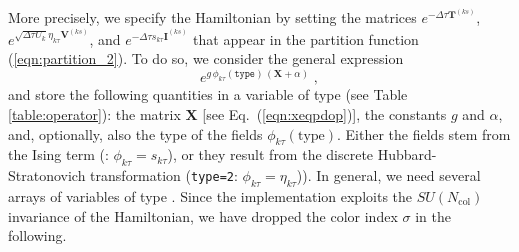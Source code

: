 More precisely, we specify the Hamiltonian by setting  the matrices 
$ e^{-\Delta \tau {\bm T}^{(ks)}}$, $e^{  \sqrt{ \Delta \tau  U_k} \eta_{k\tau} {\bm V}^{(ks)} }$, and $e^{  -\Delta \tau s_{k\tau}  {\bm I}^{(ks)}}$ that appear in the 
partition function (\ref{eqn:partition_2}). 
To do so, we consider the general expression
\begin{equation}\label{eqn:exponent_mat}
e^{g \,\phi_{k\tau}(\texttt{type})\,\left(\mathbf{X} + \alpha\right)}\;,
\end{equation}
and store the following quantities in a variable of type  (see Table \ref{table:operator}):
the matrix $\mathbf{X}$ [see Eq.~(\ref{eqn:xeqpdop})], the constants $g$ and $\alpha$, and, optionally, also 
the type of the fields $\phi_{k\tau}(\text{type})$.  Either the fields
stem from the Ising term (: $\phi_{k\tau}=s_{k\tau}$), or they result from the discrete Hubbard-Stratonovich transformation (\texttt{type=2}: $\phi_{k\tau}=\eta_{k\tau}$)).
 In general, we need  several arrays of variables of type .
Since the implementation exploits the $SU(N_{\mathrm{col}})$ invariance of the Hamiltonian, we have dropped the color index $\sigma$ in the following.
